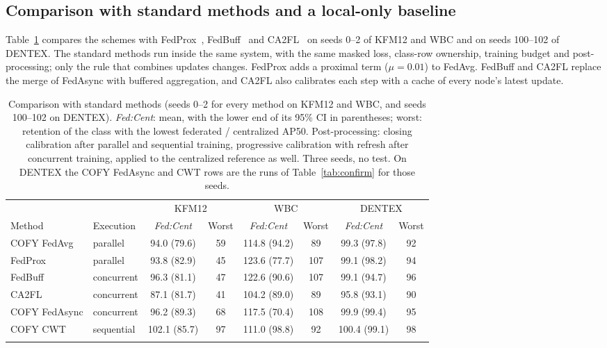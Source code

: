 \documentclass[pdflatex,sn-mathphys-num]{sn-jnl}
\newcommand{\sys}{COFY}
\newcommand{\fedcent}{\textit{Fed:Cent}}
\begin{document}
\subsection{Comparison with standard methods and a local-only baseline}\label{sec:res-baselines}
Table~\ref{tab:baselines} compares the schemes with FedProx~\cite{li2020fedprox}, FedBuff~\cite{nguyen2022fedbuff} and CA2FL~\cite{wang2024ca2fl} on seeds 0--2 of KFM12 and WBC and on seeds 100--102 of DENTEX. The standard methods run inside the same system, with the same masked loss, class-row ownership, training budget and post-processing; only the rule that combines updates changes. FedProx adds a proximal term ($\mu=0.01$) to FedAvg. FedBuff and CA2FL replace the merge of FedAsync with buffered aggregation, and CA2FL also calibrates each step with a cache of every node's latest update.

\begin{table}[t]
\caption{Comparison with standard methods (seeds 0--2 for every method on KFM12 and WBC, and seeds 100--102 on DENTEX). \fedcent{}: mean, with the lower end of its 95\% CI in parentheses; worst: retention of the class with the lowest federated / centralized AP50. Post-processing: closing calibration after parallel and sequential training, progressive calibration with refresh after concurrent training, applied to the centralized reference as well. Three seeds, no test. On DENTEX the \sys{} FedAsync and CWT rows are the runs of Table~\ref{tab:confirm} for those seeds.}\label{tab:baselines}
\footnotesize
\setlength{\tabcolsep}{3pt}
\begin{tabular*}{\textwidth}{@{\extracolsep\fill}llcccccc}
\toprule
 & & \multicolumn{2}{c}{KFM12} & \multicolumn{2}{c}{WBC} & \multicolumn{2}{c}{DENTEX} \\
Method & Execution & \fedcent{} & Worst & \fedcent{} & Worst & \fedcent{} & Worst \\
\midrule
\sys{} FedAvg & parallel & 94.0 (79.6) & 59 & 114.8 (94.2) & 89 & 99.3 (97.8) & 92 \\
FedProx & parallel & 93.8 (82.9) & 45 & 123.6 (77.7) & 107 & 99.1 (98.2) & 94 \\
FedBuff & concurrent & 96.3 (81.1) & 47 & 122.6 (90.6) & 107 & 99.1 (94.7) & 96 \\
CA2FL & concurrent & 87.1 (81.7) & 41 & 104.2 (89.0) & 89 & 95.8 (93.1) & 90 \\
\sys{} FedAsync & concurrent & 96.2 (89.3) & 68 & 117.5 (70.4) & 108 & 99.9 (99.4) & 95 \\
\sys{} CWT & sequential & 102.1 (85.7) & 97 & 111.0 (98.8) & 92 & 100.4 (99.1) & 98 \\
\botrule
\end{tabular*}
\end{table}
\end{document}
